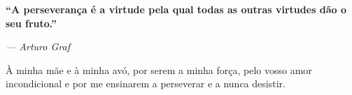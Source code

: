%
\begin{dedicatory}
\vspace*{\fill}
\begin{center}
\textbf{“A perseverança é a virtude pela qual todas as outras virtudes dão o seu fruto.”}

\textit{--- Arturo Graf}

À minha mãe e à minha avó, por serem a minha força, pelo vosso amor incondicional e por me ensinarem a perseverar e a nunca desistir.
\end{center}
\vspace*{\fill}
\end{dedicatory}


